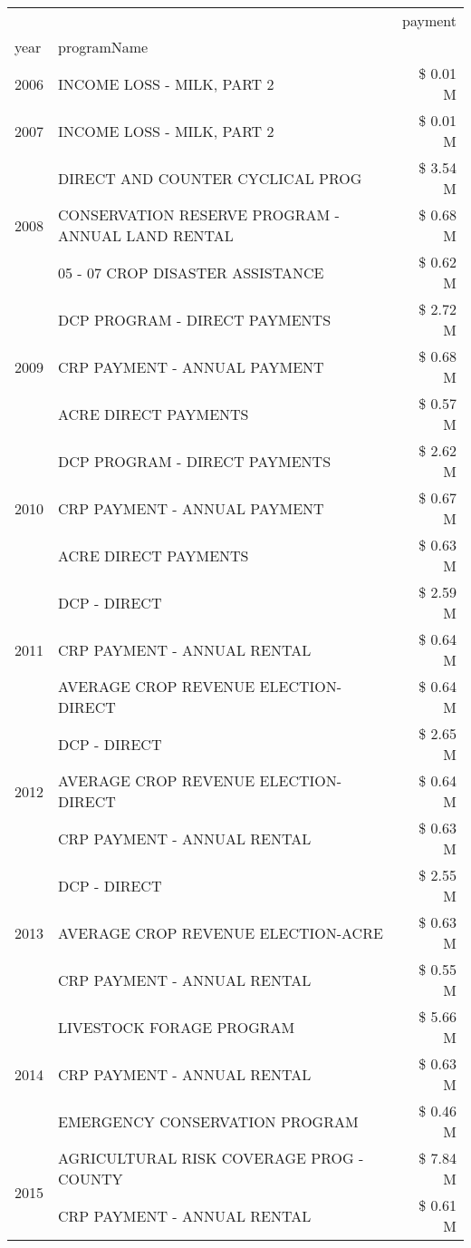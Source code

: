 \begin{tabular}{llr}
\toprule
 &  & payment \\
year & programName &  \\
\midrule
2006 & INCOME LOSS - MILK, PART 2 & \$ 0.01 M \\
\cline{1-3}
2007 & INCOME LOSS - MILK, PART 2 & \$ 0.01 M \\
\cline{1-3}
\multirow[t]{3}{*}{2008} & DIRECT AND COUNTER CYCLICAL PROG & \$ 3.54 M \\
 & CONSERVATION RESERVE PROGRAM - ANNUAL LAND RENTAL & \$ 0.68 M \\
 & 05 - 07 CROP DISASTER ASSISTANCE & \$ 0.62 M \\
\cline{1-3}
\multirow[t]{3}{*}{2009} & DCP PROGRAM - DIRECT PAYMENTS & \$ 2.72 M \\
 & CRP PAYMENT - ANNUAL PAYMENT & \$ 0.68 M \\
 & ACRE DIRECT PAYMENTS & \$ 0.57 M \\
\cline{1-3}
\multirow[t]{3}{*}{2010} & DCP PROGRAM - DIRECT PAYMENTS & \$ 2.62 M \\
 & CRP PAYMENT - ANNUAL PAYMENT & \$ 0.67 M \\
 & ACRE DIRECT PAYMENTS & \$ 0.63 M \\
\cline{1-3}
\multirow[t]{3}{*}{2011} & DCP - DIRECT & \$ 2.59 M \\
 & CRP PAYMENT - ANNUAL RENTAL & \$ 0.64 M \\
 & AVERAGE CROP REVENUE ELECTION-DIRECT & \$ 0.64 M \\
\cline{1-3}
\multirow[t]{3}{*}{2012} & DCP - DIRECT & \$ 2.65 M \\
 & AVERAGE CROP REVENUE ELECTION-DIRECT & \$ 0.64 M \\
 & CRP PAYMENT - ANNUAL RENTAL & \$ 0.63 M \\
\cline{1-3}
\multirow[t]{3}{*}{2013} & DCP - DIRECT & \$ 2.55 M \\
 & AVERAGE CROP REVENUE ELECTION-ACRE & \$ 0.63 M \\
 & CRP PAYMENT - ANNUAL RENTAL & \$ 0.55 M \\
\cline{1-3}
\multirow[t]{3}{*}{2014} & LIVESTOCK FORAGE PROGRAM & \$ 5.66 M \\
 & CRP PAYMENT - ANNUAL RENTAL & \$ 0.63 M \\
 & EMERGENCY CONSERVATION PROGRAM & \$ 0.46 M \\
\cline{1-3}
\multirow[t]{3}{*}{2015} & AGRICULTURAL RISK COVERAGE PROG - COUNTY & \$ 7.84 M \\
 & CRP PAYMENT - ANNUAL RENTAL & \$ 0.61 M \\

\end{tabular}
